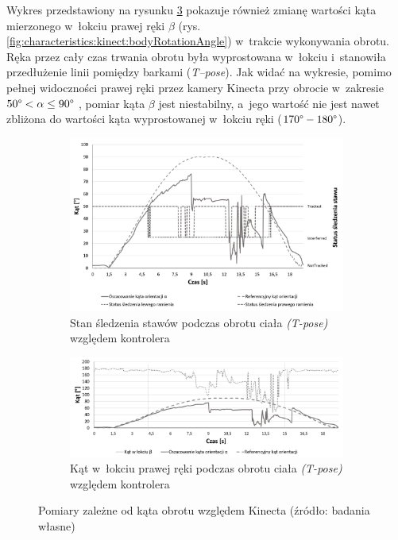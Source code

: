 Wykres przedstawiony na rysunku \ref{fig:characteristics:kinect:kinectRightHandElbowAngle} pokazuje również zmianę wartości kąta mierzonego w~łokciu prawej ręki $\beta$ (rys. \ref{fig:characteristics:kinect:bodyRotationAngle}) w~trakcie wykonywania obrotu. Ręka przez cały czas trwania obrotu była wyprostowana w~łokciu i~stanowiła przedłużenie linii pomiędzy barkami (\emph{T--pose}). Jak widać na wykresie, pomimo pełnej widoczności prawej ręki przez kamery Kinecta przy obrocie w~zakresie  $50\degree < \alpha \le 90\degree$ , pomiar kąta $\beta$ jest niestabilny, a~jego wartość nie jest nawet zbliżona do wartości kąta wyprostowanej w~łokciu ręki ($170\degree-180\degree$). 
\begin{savenotes}
	\begin{figure}[!htb]
		\captionsetup{singlelinecheck=off}
		\centering
		\begin{subfigure}[b]{0.9\textwidth}
			\centering
			\includegraphics[width=\linewidth]{images/kinectRotation.png}	
			\caption{Stan śledzenia stawów podczas obrotu ciała \emph{(T-pose)} względem kontrolera}
			\label{fig:characteristics:kinect:bodyRotationChart}
		\end{subfigure}
				
		\hfill																																																
		\begin{subfigure}[b]{0.9\textwidth}
			\centering
			\includegraphics[width=\linewidth]{images/kinectRightHandElbowAngle.png}		
			\caption{Kąt w~łokciu prawej ręki podczas obrotu ciała \emph{(T-pose)} względem kontrolera}
			\label{fig:characteristics:kinect:kinectRightHandElbowAngle}
		\end{subfigure}				
		\caption{Pomiary zależne od kąta obrotu względem Kinecta (źródło: badania własne)}
	\end{figure}
\end{savenotes}
																																					
